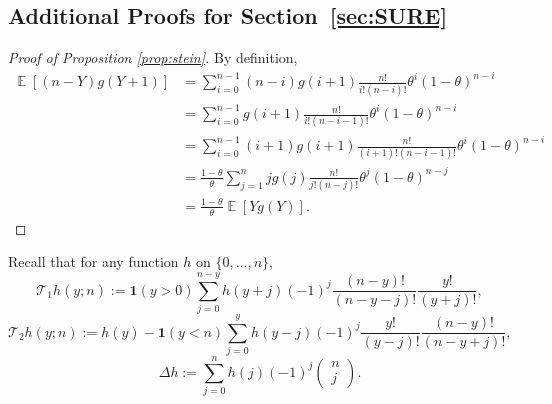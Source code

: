 \documentclass[12pt,letterpaper]{article}
\newcommand{\com}[2]{
  \left(\begin{array}{cc}
    #1 \\ #2
  \end{array}\right)
}
\newcommand{\E}{\operatorname{\mathbb{E}}}
\newcommand{\T}{\mathcal{T}}
\begin{document}
\subsection{Additional Proofs for Section~\ref{sec:SURE}}
\begin{proof}[Proof of Proposition \ref{prop:stein}]
  By definition,
  \begin{align*}
    \E[(n - Y)g(Y + 1)] & = \sum_{i=0}^{n-1} (n - i)g(i+1) \frac{n!}{i!(n - i)!}\theta^{i}(1 - \theta)^{n-i}\\
                        & = \sum_{i=0}^{n-1} g(i+1) \frac{n!}{i!(n - i - 1)!}\theta^{i}(1 - \theta)^{n-i}\\
                        & = \sum_{i=0}^{n-1} (i+1)g(i+1) \frac{n!}{(i + 1)!(n - i - 1)!}\theta^{i}(1 - \theta)^{n-i}\\
                        & = \frac{1 - \theta}{\theta}\sum_{j=1}^{n} jg(j) \frac{n!}{j!(n - j)!}\theta^{j}(1 - \theta)^{n-j}\\
                        & = \frac{1 - \theta}{\theta}\E[Yg(Y)].
  \end{align*}
\end{proof}

\noindent Recall that 
for any function $h$ on $\{0, \ldots, n\}$, 
$$\T_1 h(y; n) := \mathbf{1}(y > 0)\sum_{j=0}^{n-y}h(y + j)(-1)^{j}\frac{(n-y)!}{(n-y-j)!}\frac{y!}{(y+j)!},$$
$$\T_2 h(y; n) := h(y) - \mathbf{1}(y < n)\sum_{j=0}^{y}h(y - j)(-1)^{j}\frac{y!}{(y-j)!}\frac{(n - y)!}{(n-y+j)!},$$
$$\Delta h := \sum_{j=0}^{n}h(j)(-1)^{j}\com{n}{j}.$$
\end{document}
